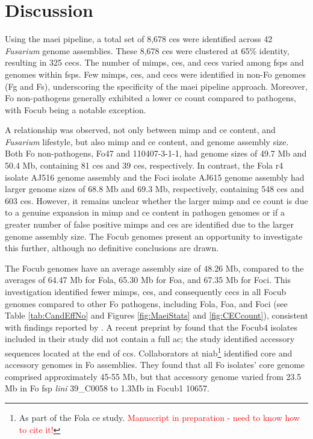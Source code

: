 \newpage
\section{Discussion}

Using the \ac{maei} pipeline, a total set of 8,678 \acp{ce} were identified across 42 \textit{Fusarium} genome assemblies. These 8,678 \acp{ce} were clustered at 65\% identity, resulting in 325 \acfp{cec}. The number of \acp{mimp}, \acp{ce}, and \acp{cec} varied among \acp{fsp} and genomes within \acp{fsp}. Few \acp{mimp}, \acp{ce}, and \acp{cec} were identified in non-\ac{Fo} genomes (\acl{Fg} and \acl{Fs}), underscoring the specificity of the \ac{maei} pipeline approach. Moreover, \ac{Fo} non-pathogens generally exhibited a lower \ac{ce} count compared to  pathogens, with \ac{Focub} being a notable exception.

A relationship was observed, not only between \ac{mimp} and \ac{ce} content, and \textit{Fusarium} lifestyle,  but also \ac{mimp} and \ac{ce} content, and genome assembly size. Both \ac{Fo} non-pathogens, Fo47 and 110407-3-1-1, had genome sizes of 49.7 Mb and 50.4 Mb, containing 81 \acp{ce} and 39 \acp{ce}, respectively. In contrast, the \ac{Fola} \ac{r4} isolate AJ516 genome assembly and the \ac{Foci} isolate AJ615 genome assembly had larger genome sizes of 68.8 Mb and 69.3 Mb, respectively, containing 548 \acp{ce} and 603 \acp{ce}. However, it remains unclear whether the larger \ac{mimp} and \ac{ce} count is due to a genuine expansion in \ac{mimp} and \ac{ce} content in pathogen genomes or if a greater number of false positive \acp{mimp} and \acp{ce} are identified due to the larger genome assembly size. The \ac{Focub} genomes present an opportunity to investigate this further, although no definitive conclusions are drawn.

The \ac{Focub} genomes have an average assembly size of 48.26 Mb, compared to the averages of 64.47 Mb for \ac{Fola}, 65.30 Mb for \ac{Foa}, and 67.35 Mb for \ac{Foci}. This investigation identified fewer \acp{mimp}, \acp{ce}, and consequently \acp{cec} in all \ac{Focub} genomes compared to other \ac{Fo} pathogens, including \ac{Fola}, \ac{Foa}, and \ac{Foci} (see Table \ref{tab:CandEffNo} and Figures \ref{fig:MaeiStats} and \ref{fig:CECcount}), consistent with findings reported by \textcite{Dam2016, FoEC2}. A recent preprint by \textcite{Ma2023} found that the \ac{Focub4} isolates included in their study did not contain a full \acf{ac}; the study identified accessory sequences located at the end of \acfp{cc}. Collaborators at \ac{niab}\footnote{As part of the \acf{Fola} \ac{ce} study. \textcolor{red}{Manuscript in preparation - need to know how to cite it!}} identified core and accessory genomes in \ac{Fo} assemblies. They found that all \ac{Fo} isolates' core genome comprised approximately 45-55 Mb, but that accessory genome varied from 23.5 Mb in \ac{Fo} \ac{fsp} \textit{lini} 39\_C0058 to 1.3Mb in \ac{Focub1} 10657. 

